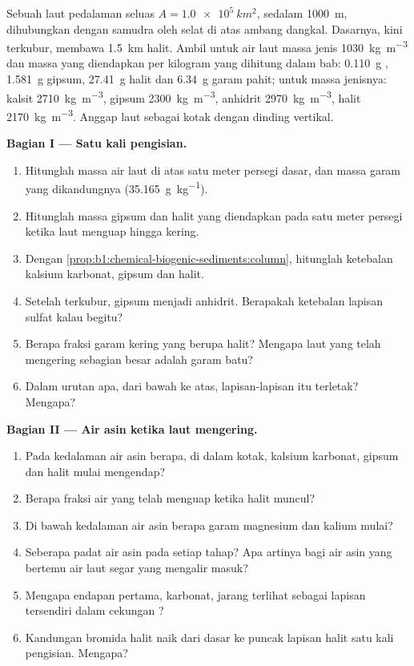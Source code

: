 \begin{problem}
\label{pb:b1:chemical-biogenic-sediments:1}
Sebuah laut pedalaman seluas $A = \qty{1.0e5}{km^2}$, sedalam \qty{1000}{m}, dihubungkan dengan samudra oleh selat di atas ambang dangkal. Dasarnya, kini terkubur, membawa \qty{1.5}{km} halit. Ambil untuk air laut massa jenis \qty{1030}{kg.m^{-3}} dan massa yang diendapkan per kilogram yang dihitung dalam bab: \qty{0.110}{g} , \qty{1.581}{g} gipsum, \qty{27.41}{g} halit dan \qty{6.34}{g} garam pahit; untuk  massa jenisnya: kalsit \qty{2710}{kg.m^{-3}}, gipsum \qty{2300}{kg.m^{-3}}, anhidrit \qty{2970}{kg.m^{-3}}, halit \qty{2170}{kg.m^{-3}}. Anggap laut sebagai kotak dengan dinding vertikal.

\medskip
\noindent\textbf{Bagian I --- Satu kali pengisian.}
\begin{enumerate}
  \item Hitunglah massa air laut di atas satu meter persegi dasar, dan massa garam yang dikandungnya (\qty{35.165}{g.kg^{-1}}).
  \item Hitunglah massa gipsum dan halit yang diendapkan pada satu meter persegi ketika laut menguap hingga kering.
  \item Dengan \cref{prop:b1:chemical-biogenic-sediments:column}, hitunglah ketebalan kalsium karbonat, gipsum dan halit.
  \item Setelah terkubur, gipsum menjadi anhidrit. Berapakah ketebalan lapisan sulfat kalau begitu?
  \item Berapa fraksi garam kering yang berupa halit? Mengapa laut yang telah mengering sebagian besar adalah garam batu?
  \item Dalam urutan apa, dari bawah ke atas, lapisan-lapisan itu terletak? Mengapa?
\end{enumerate}

\noindent\textbf{Bagian II --- Air asin ketika laut mengering.}
\begin{enumerate}[resume]
  \item Pada kedalaman air asin berapa, di dalam kotak, kalsium karbonat, gipsum dan halit mulai mengendap?
  \item Berapa fraksi air yang telah menguap ketika halit muncul?
  \item Di bawah kedalaman air asin berapa garam magnesium dan kalium mulai?
  \item Seberapa padat air asin pada setiap tahap? Apa artinya bagi air asin yang bertemu air laut segar yang mengalir masuk?
  \item Mengapa endapan pertama, karbonat, jarang terlihat sebagai lapisan tersendiri dalam cekungan ?
  \item Kandungan bromida halit naik dari dasar ke puncak lapisan halit satu kali pengisian. Mengapa?
\end{enumerate}


\end{problem}
